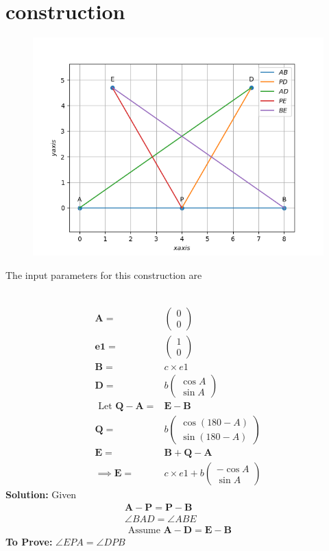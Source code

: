 \documentclass[10pt]{article}
\newcommand{\solution}{\noindent \textbf{Solution: }}
\newcommand{\myvec}[1]{\ensuremath{\begin{pmatrix}#1\end{pmatrix}}}
\let\vec\mathbf{}
\begin{document}
\section{construction}
\begin{figure}[h!]
	\begin{center}
		\includegraphics[width=5in]{./figs/fig.png}
	\end{center}
\caption{}
\label{fig:Fig1}
\end{figure}
The input parameters for this construction are\\
\begin{table}[h!]
	\centering
 	
\caption{}
\label{table}
\end{table}\\
\begin{align}
	\vec{A}=&\myvec{0\\0}\\
	\vec{e1}=&\myvec{1\\0}\\
	\vec{B}=&c\times e1\\
	\vec{D}=&b\myvec{\cos{A}\\\sin{A}}\\
	\text{ Let  }\vec{Q}-\vec{A} =& \vec{E}-\vec{B}\\
	\vec{Q}=&b\myvec{\cos{(180-A)}\\\sin{(180-A)}}\\
	\vec{E}=&\vec{B}+\vec{Q}-\vec{A}\\
	\implies\vec{E}=&c\times e1+b\myvec{-\cos{A}\\\sin{A}}
\end{align}
\solution
Given\\
\begin{align}
\vec{A}-\vec{P} = \vec{P}-\vec{B}\\
\angle BAD = \angle ABE\\
\text { Assume  }\vec{A}-\vec{D}=\vec{E}-\vec{B}
\end{align}
\textbf{To Prove:}  $\angle EPA = \angle DPB$
\end{document}
